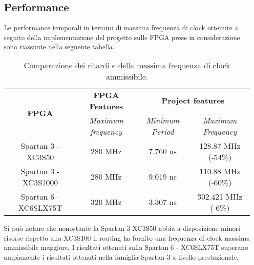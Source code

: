 \subsection{Performance}
Le performance temporali in termini di massima frequenza di clock ottenute a seguito della implementazione del progetto sulle FPGA prese in considerazione sono riassunte nella seguente tabella.
\begin{table}[H]
	\centering
	\fontsize{10}{18}\selectfont
	\begin{tabular}{|p{30mm}|p{30mm}|p{30mm}|p{30mm}|}
		\hline
		\multicolumn{1}{|c|}{\multirow{2}{*}{\textbf{{FPGA}}}} &
		\multicolumn{1}{c|}{\textbf{FPGA Features}} & 
		\multicolumn{2}{c|}{\textbf{Project features}} \\
		
		\cline{2-4}
		\multicolumn{1}{|c|}{} &
		\multicolumn{1}{c|}{\textit{Maximum frequency}} & 
		\multicolumn{1}{c|}{\textit{Minimum Period}} &
		\multicolumn{1}{c|}{\textit{Maximum Frequency}} \\
		
		\hline
		\multicolumn{1}{|c|}{Spartan 3 - XC3S50} &
		\multicolumn{1}{c|}{280 MHz} & 
		\multicolumn{1}{c|}{7.760 ns} &
		\multicolumn{1}{c|}{128.87 MHz (-54\%)} \\
		
		\hline
		\multicolumn{1}{|c|}{Spartan 3 - XC3S1000} &
		\multicolumn{1}{c|}{280 MHz} & 
		\multicolumn{1}{c|}{9.019 ns} &
		\multicolumn{1}{c|}{110.88 MHz (-60\%)} \\
		
		\hline
		\multicolumn{1}{|c|}{Spartan 6 - XC6SLX75T} &
		\multicolumn{1}{c|}{320 MHz} & 
		\multicolumn{1}{c|}{3.307 ns} &
		\multicolumn{1}{c|}{302.421 MHz (-6\%)}\\ \hline
		
	\end{tabular}
\caption{Comparazione dei ritardi e della massima frequenza di clock ammissibile.}
\end{table}
\noindent
Si può notare che nonostante la Spartan 3 XC3S50 abbia a disposizione minori risorse rispetto alla XC3S100 il routing ha fornito una frequenza di clock massima ammissibile maggiore. I risultati ottenuti sulla Spartan 6 - XC6SLX75T superano ampiamente i risultati ottenuti nella famiglia Spartan 3 a livello prestazionale.

